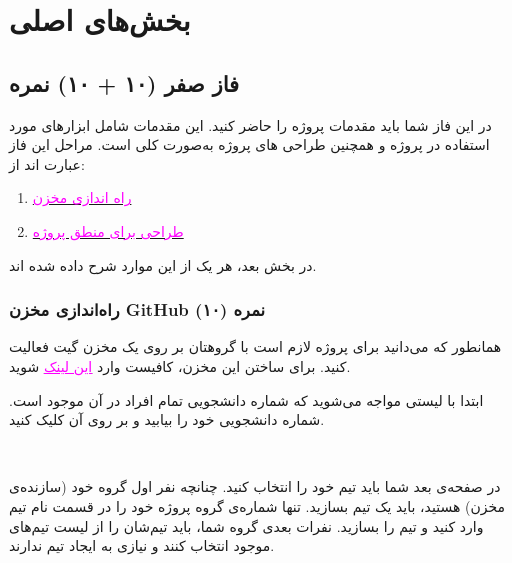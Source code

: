 \documentclass[]{article}
\begin{document}
\section*{{\titr بخش‌های اصلی }}


\subsection*{{\titr فاز صفر} (۱۰ + ۱۰) نمره} 

در این فاز شما باید مقدمات پروژه را حاضر کنید. این مقدمات شامل ابزارهای مورد استفاده در پروژه و همچنین طراحی  های پروژه به‌صورت کلی است. مراحل این فاز عبارت اند از:

\begin{enumerate}
	\item
	\hyperref[subsubsec:github]{\textcolor{magenta}{راه اندازی مخزن }}
	
	\item
	\hyperref[subsubsec:fsm]{\textcolor{magenta}{طراحی  برای منطق پروژه}}
\end{enumerate}

در بخش بعد، هر یک از این موارد شرح داده شده اند.



\subsubsection*{{\titr راه‌اندازی مخزن GitHub} (۱۰) نمره}
\label{subsubsec:github}

همانطور که می‌دانید برای پروژه لازم است با گروهتان بر روی یک مخزن  گیت فعالیت کنید. برای ساختن این مخزن، کافیست وارد
\href{https://classroom.github.com/a/rBR982eM}{\textcolor{magenta}{\underline{این لینک}}} 
شوید.

ابتدا با لیستی مواجه می‌شوید که شماره دانشجویی تمام افراد در آن موجود است. شماره دانشجویی خود را بیابید و بر روی آن کلیک کنید.

\newpage
\Large \textbf{\\
}

در صفحه‌ی بعد شما باید تیم خود را انتخاب کنید. چنانچه نفر اول گروه خود (سازنده‌ی مخزن) هستید، باید یک تیم بسازید. تنها شماره‌ی گروه پروژه خود را در قسمت نام تیم وارد کنید و تیم را بسازید. نفرات بعدی گروه شما، باید تیم‌شان را از لیست تیم‌های موجود انتخاب کنند و نیازی به ایجاد تیم ندارند.
\end{document}
